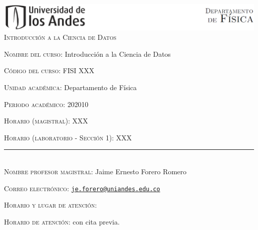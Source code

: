 \documentclass[letterpaper,10pt,onecolumn]{article}
\begin{document}
\begin{center}

\includegraphics[width=490pt]{header.png}\\[0.5cm]

\textsc{\LARGE Introducci\'on a la Ciencia de Datos}\\[0.1cm]

\end{center}

\large \noindent\textsc{Nombre del curso:}  Introducci\'on a la Ciencia de Datos%
  
\noindent\textsc{C\'odigo del curso:} FISI XXX %

\noindent\textsc{Unidad acad\'emica:} Departamento de F\'isica

\noindent\textsc{Periodo acad\'emico:} 202010 %

\noindent\textsc{Horario (magistral):} XXX

\noindent\textsc{Horario (laboratorio - Secci\'on 1):} XXX


\noindent\rule{\textwidth}{1pt}\\[-0.3cm]

\normalsize \noindent\textsc{Nombre profesor magistral:}
Jaime Ernesto Forero Romero%

\noindent\textsc{Correo electr\'onico:}
\href{mailto:je.forero@uniandes.edu.co}{\nolinkurl{je.forero@uniandes.edu.co}}

\noindent\textsc{Horario y lugar de atenci\'on:} 



\noindent\textsc{Horario de atenci\'on:} con cita previa. 
\\[-0.1cm]
\end{document}
